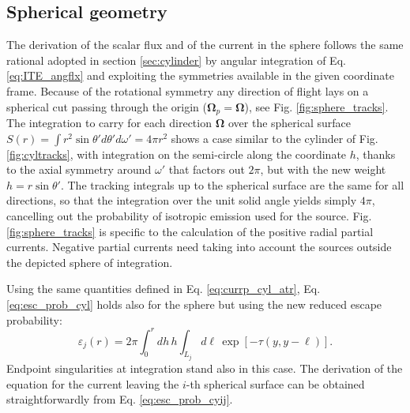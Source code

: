 \documentclass{ictt26}
\begin{document}
\subsection{Spherical geometry}
\label{sec:sphere}

The derivation of the scalar flux and of the current in the sphere follows the same rational adopted in section \ref{sec:cylinder} by angular integration of Eq. \ref{eq:ITE_angflx} and exploiting the symmetries available in the given coordinate frame. Because of the rotational symmetry any direction of flight lays on a spherical cut passing through the origin ($\mathbf{\Omega}_p = \mathbf{\Omega}$), see Fig. \ref{fig:sphere_tracks}. The integration to carry for each direction $\mathbf{\Omega}$ over the spherical surface $S(r) = \int{r^2\sin \theta' d\theta' d\omega'} = 4\pi r^2$ shows a case similar to the cylinder of Fig. \ref{fig:cyltracks}, with integration on the semi-circle along the coordinate $h$, thanks to the axial symmetry around $\omega'$ that factors out $2\pi$, but with the new weight $h = r\sin \theta'$. The tracking integrals up to the spherical surface are the same for all directions, so that the integration over the unit solid angle yields simply $4\pi$, cancelling out the probability of isotropic emission used for the source. Fig. \ref{fig:sphere_tracks} is specific to the calculation of the positive radial partial currents. Negative partial currents need taking into account the sources outside the depicted sphere of integration.

Using the same quantities defined in Eq. \ref{eq:currp_cyl_atr}, Eq. \ref{eq:esc_prob_cyl} holds also for the sphere but using the new reduced escape probability:
\begin{equation}
\varepsilon_j(r) = 2\pi \int_0^r { dh\,
  h \int_{L_j}{d \ell \, \exp\left[-\tau( y, y - \ell )\right]}}.
\label{eq:esc_prob_sph}
\end{equation}
Endpoint singularities at integration stand also in this case. The derivation of the equation for the current leaving the $i$-th spherical surface can be obtained straightforwardly from Eq. \ref{eq:esc_prob_cyij}.
\end{document}

